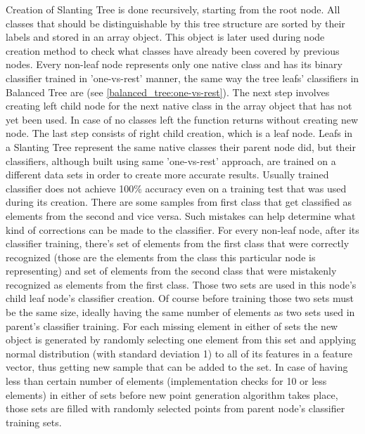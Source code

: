 Creation of Slanting Tree is done recursively, starting from the root node. All classes that should be distinguishable by this tree structure are sorted by their labels and stored in an array object. This object is later used during node creation method to check what classes have already been covered by previous nodes. Every non-leaf node represents only one native class and has its binary classifier trained in 'one-vs-rest' manner, the same way the tree leafs' classifiers in Balanced Tree are (see \ref{balanced_tree:one-vs-rest}). The next step involves creating left child node for the next native class in the array object that has not yet been used. In case of no classes left the function returns without creating new node. The last step consists of right child creation, which is a leaf node. Leafs in a Slanting Tree represent the same native classes their parent node did, but their classifiers, although built using same 'one-vs-rest' approach, are trained on a different data sets in order to create more accurate results. Usually trained classifier does not achieve 100\% accuracy even on a training test that was used during its creation. There are some samples from first class that get classified as elements from the second and vice versa. Such mistakes can help determine what kind of corrections can be made to the classifier. For every non-leaf node, after its classifier training, there's set of elements from the first class that were correctly recognized (those are the elements from the class this particular node is representing) and set of elements from the second class that were mistakenly recognized as elements from the first class. Those two sets are used in this node's child leaf node's classifier creation. Of course before training those two sets must be the same size, ideally having the same number of elements as two sets used in parent's classifier training. For each missing element in either of sets the new object is generated by randomly selecting one element from this set and applying normal distribution (with standard deviation 1) to all of its features in a feature vector, thus getting new sample that can be added to the set. In case of having less than certain number of elements (implementation checks for 10 or less elements) in either of sets before new point generation algorithm takes place, those sets are filled with randomly selected points from parent node's classifier training sets.
